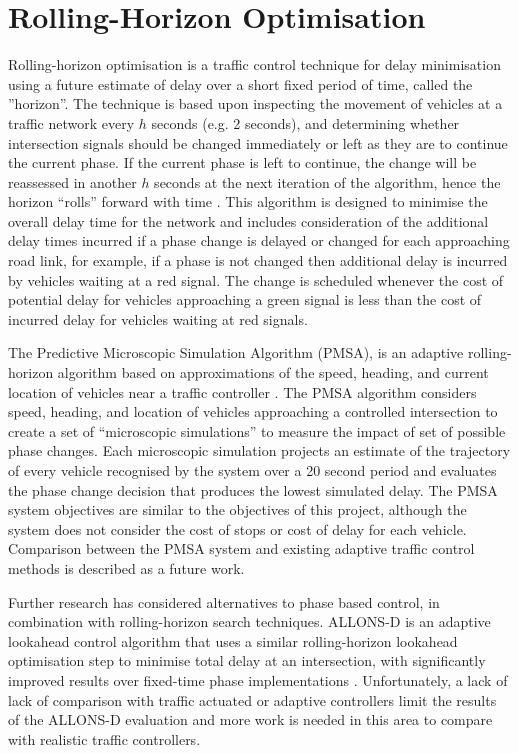 \section{Rolling-Horizon Optimisation}
\label{bg:rolling-horizon}

Rolling-horizon optimisation is a traffic control technique for delay minimisation using a future estimate of delay over a short fixed period of time, called the ''horizon''. The technique is based upon inspecting the movement of vehicles at a traffic network every $h$ seconds (e.g. 2 seconds), and determining whether intersection signals should be changed immediately or left as they are to continue the current phase. If the current phase is left to continue, the change will be reassessed in another $h$ seconds at the next iteration of the algorithm, hence the horizon ``rolls'' forward with time \cite{miller1963computer}. This algorithm is designed to minimise the overall delay time for the network and includes consideration of the additional delay times incurred if a phase change is delayed or changed for each approaching road link, for example, if a phase is not changed then additional delay is incurred by vehicles waiting at a red signal. The change is scheduled whenever the cost of potential delay for vehicles approaching a green signal is less than the cost of incurred delay for vehicles waiting at red signals.

The Predictive Microscopic Simulation Algorithm (PMSA), is an adaptive rolling-horizon algorithm based on approximations of the speed, heading, and current location of vehicles near a traffic controller \cite{smith2010intellidrive}. The PMSA algorithm considers speed, heading, and location of vehicles approaching a controlled intersection to create a set of ``microscopic simulations'' to measure the impact of set of possible phase changes. Each microscopic simulation projects an estimate of the trajectory of every vehicle recognised by the system over a 20 second period and evaluates the phase change decision that produces the lowest simulated delay. The PMSA system objectives are similar to the objectives of this project, although the system does not consider the cost of stops or cost of delay for each vehicle. Comparison between the PMSA system and existing adaptive traffic control methods is described as a future work.

Further research has considered alternatives to phase based control, in combination with rolling-horizon search techniques.  ALLONS-D is an adaptive lookahead control algorithm that uses a similar rolling-horizon lookahead optimisation step to minimise total delay at an intersection, with significantly improved results over fixed-time phase implementations \cite{porche1996allonsd}. Unfortunately, a lack of  lack of comparison with traffic actuated or adaptive controllers limit the results of the ALLONS-D evaluation and more work is needed in this area to compare with realistic traffic controllers. 

